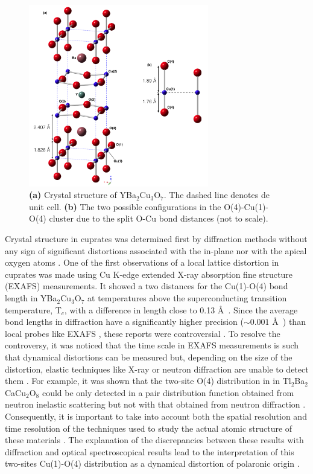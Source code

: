 \begin{figure}[ht]
  \centering
  \includegraphics[width=0.7\textwidth]{images/YBCO_O-Cu-O.jpg}
  \caption[Crystal structure of YBa$_{2}$Cu$_{3}$O$_{7}$ and the two possible O(4)-Cu(1)-O(4) configurations.]
  {\textbf{(a)} Crystal structure of YBa$_{2}$Cu$_{3}$O$_{7}$. The dashed line denotes de unit cell. \textbf{(b)} The two possible configurations in the O(4)-Cu(1)-O(4) cluster due to the split O-Cu bond distances (not to scale).}
\label{fig:YBCO_structure}
\end{figure}

Crystal structure in cuprates was determined first by diffraction methods without any sign of significant distortions associated with the in-plane nor with the apical oxygen atoms \cite{Capponi1987,Schafer1988}. 
One of the first observations of a local lattice distortion in cuprates was made using Cu K-edge extended X-ray absorption fine structure (EXAFS) measurements.
It showed a two distances for the Cu(1)-O(4) bond length in YBa$_2$Cu$_3$O$_7$ at temperatures above the superconducting transition temperature, T$_{c}$, with a difference in length close to 0.13 \AA\ \cite{MustredeLeon1990,Conradson1990}.
Since the average bond lengths in diffraction have a significantly higher precision ($\sim 0.001$ \AA\ \cite{Miceli1988}) than local probes like EXAFS \cite{Rehr2000}, these reports were controversial \cite{Kwei1990}.
To resolve the controversy, it was noticed that the time scale in EXAFS measurements is such that dynamical distortions can be measured but, depending on the size of the distortion, elastic techniques like X-ray or neutron diffraction are unable to detect them \cite{Salkola1995}.
For example, it was shown that the two-site O(4) distribution in in Tl$_{2}$Ba$_{2}$CaCu$_{2}$O$_{8}$ could be only detected in a pair distribution function obtained from neutron inelastic scattering but not with that obtained from neutron diffraction \cite{Egami1991}. 
Consequently, it is important to take into account both the spatial resolution and time resolution of the techniques used to study the actual atomic structure of these materials \cite{Mihailovic2005}. 
The explanation of the discrepancies between these results with diffraction and optical spectroscopical results lead to the interpretation of this two-sites Cu(1)-O(4) distribution as a dynamical distortion of polaronic origin \cite{MustredeLeon1992}.

